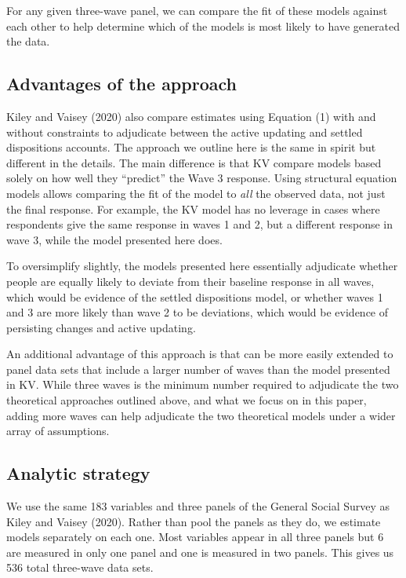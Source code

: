 \documentclass[
  11pt,
]{article}
\begin{document}
For any given three-wave panel, we can compare the fit of these models against each other to help determine which of the models is most likely to have generated the data.

\hypertarget{advantages-of-the-approach}{%
\subsection{Advantages of the approach}\label{advantages-of-the-approach}}

Kiley and Vaisey (2020) also compare estimates using Equation (1) with and without constraints to adjudicate between the active updating and settled dispositions accounts. The approach we outline here is the same in spirit but different in the details. The main difference is that KV compare models based solely on how well they ``predict'' the Wave 3 response. Using structural equation models allows comparing the fit of the model to \emph{all} the observed data, not just the final response. For example, the KV model has no leverage in cases where respondents give the same response in waves 1 and 2, but a different response in wave 3, while the model presented here does.

To oversimplify slightly, the models presented here essentially adjudicate whether people are equally likely to deviate from their baseline response in all waves, which would be evidence of the settled dispositions model, or whether waves 1 and 3 are more likely than wave 2 to be deviations, which would be evidence of persisting changes and active updating.

An additional advantage of this approach is that can be more easily extended to panel data sets that include a larger number of waves than the model presented in KV. While three waves is the minimum number required to adjudicate the two theoretical approaches outlined above, and what we focus on in this paper, adding more waves can help adjudicate the two theoretical models under a wider array of assumptions.

\hypertarget{analytic-strategy}{%
\subsection{Analytic strategy}\label{analytic-strategy}}

We use the same 183 variables and three panels of the General Social Survey as Kiley and Vaisey (2020). Rather than pool the panels as they do, we estimate models separately on each one. Most variables appear in all three panels but 6 are measured in only one panel and one is measured in two panels. This gives us 536 total three-wave data sets.
\end{document}
